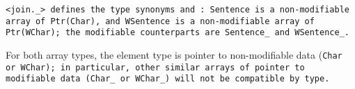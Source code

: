 \tt{<join._>} defines the type synonyms  and :
\tt{Sentence} is a non-modifiable array of \tt{Ptr(Char)}, and
\tt{WSentence} is a non-modifiable array of \tt{Ptr(WChar)};
the modifiable counterparts are \tt{Sentence_} and \tt{WSentence_}.

\note For both array types, the element type is pointer to non-modifiable
data (\tt{Char} or \tt{WChar}); in particular, other similar arrays of pointer
to modifiable data (\tt{Char_} or \tt{WChar_}) will not be compatible by type.
